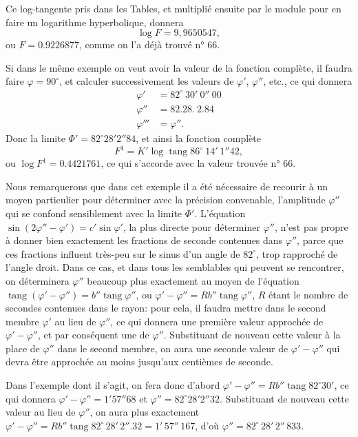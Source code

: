 \documentclass{article}
\begin{document}
Ce log-tangente pris dans les Tables, et multiplié ensuite par le module pour en faire un logarithme hyperbolique, donnera
\[ \log F=9{,}9650547, \]
ou $F=0.9226877$, comme on l'a déjà trouvé n° 66.

Si dans le même exemple on veut avoir la valeur de la fonction complète, il faudra faire $\varphi=90^{\circ}$, et calculer successivement les valeurs de $\varphi'$, $\varphi''$, etc., ce qui donnera
\[ \begin{aligned} \varphi'&=82^{\circ}\ 30'\ 0''\ 00\\ \varphi''&=82.28.\ 2.84\\ \varphi'''&=\varphi''. \end{aligned} \]
Donc la limite $\Phi'=82^{\circ}28'2''84$, et ainsi la fonction complète
\[ F^{1}=K'\log\operatorname{tang}86^{\circ}\ 14'\ 1''42, \]
ou $\log F^{1}=0.4421761$, ce qui s'accorde avec la valeur trouvée n° 66.

Nous remarquerons que dans cet exemple il a été nécessaire de recourir à un moyen particulier pour déterminer avec la précision convenable, l'amplitude $\varphi''$ qui se confond sensiblement avec la limite $\Phi'$. L'équation $\sin(2\varphi''-\varphi')=c'\sin\varphi'$, la plus directe pour déterminer $\varphi''$, n'est pas propre à donner bien exactement les fractions de seconde contenues dans $\varphi''$, parce que ces fractions influent très-peu sur le sinus d'un angle de $82^{\circ}$, trop rapproché de l'angle droit. Dans ce cas, et dans tous les semblables qui peuvent se rencontrer, on déterminera $\varphi''$ beaucoup plus exactement au moyen de l'équation $\operatorname{tang}(\varphi'-\varphi'')=b''\operatorname{tang}\varphi''$, ou $\varphi'-\varphi''=Rb''\operatorname{tang}\varphi''$, $R$ étant le nombre de secondes contenues dans le rayon: pour cela, il faudra mettre dans le second membre $\varphi'$ au lieu de $\varphi''$, ce qui donnera une première valeur approchée de $\varphi'-\varphi''$, et par conséquent une de $\varphi''$. Substituant de nouveau cette valeur à la place de $\varphi''$ dans le second membre, on aura une seconde valeur de $\varphi'-\varphi''$ qui devra être approchée au moins jusqu'aux centièmes de seconde.

Dans l'exemple dont il s'agit, on fera donc d'abord $\varphi'-\varphi''=Rb''\operatorname{tang}82^{\circ}30'$, ce qui donnera $\varphi'-\varphi''=1'57''68$ et $\varphi''=82^{\circ}28'2''32$. Substituant de nouveau cette valeur au lieu de $\varphi''$, on aura plus exactement $\varphi'-\varphi''=Rb''\operatorname{tang}82^{\circ}\,28'\,2''.32=1'\,57''\,167$, d'où $\varphi''=82^{\circ}\,28'\,2''\,833$.
\end{document}
